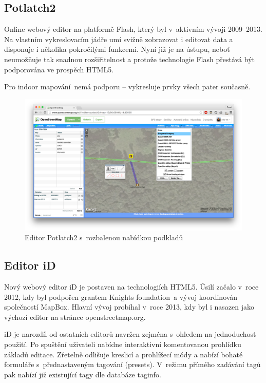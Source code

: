 \subsection{Potlatch2}\label{potlatch2}

Online webový editor na platformě Flash, který byl v~aktivním vývoji 2009--2013. Na vlastním vykreslovacím jádře umí svižně zobrazovat i editovat data a disponuje i několika pokročilými funkcemi. Nyní již je na ústupu, neboť neumožňuje tak snadnou rozšiřitelnost a protože technologie Flash přestává být podporována ve prospěch HTML5.

Pro indoor mapování~nemá podporu -- vykresluje prvky všech pater současně.

 \begin{figure}
	  \centering
      \includegraphics[width=\textwidth]{img/24-editor-potlatch2.png}
      \caption{Editor Potlatch2 s~rozbalenou nabídkou podkladů}
      \label{obr24}
  \end{figure}

\subsection{Editor iD}\label{editor-id}

Nový webový editor iD je postaven na technologiích HTML5. Úsilí začalo v~roce 2012, kdy byl podpořen grantem Knights foundation\cite{zdroj45}~a vývoj koordinován společností MapBox. Hlavní vývoj probíhal v~roce 2013, kdy byl i nasazen jako výchozí editor na stránce openstreetmap.org.

iD je narozdíl od ostatních editorů navržen zejména s~ohledem na jednoduchost použití. Po spuštění uživateli nabídne interaktivní komentovanou prohlídku základů editace. Zřetelně odlišuje kreslicí a prohlížecí módy a nabízí bohaté formuláře s~přednastaveným tagování (presets). V~režimu přímého zadávání tagů pak nabízí již existující tagy dle databáze taginfo.

